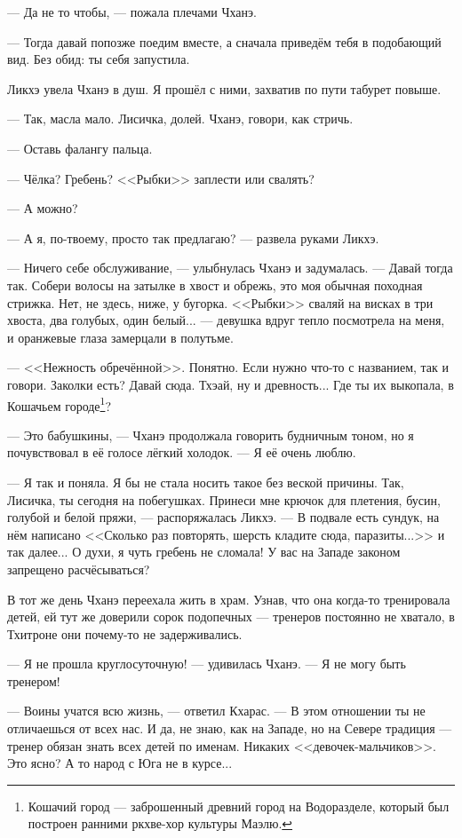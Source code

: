 --- Да не то чтобы, --- пожала плечами Чханэ.

--- Тогда давай попозже поедим вместе, а сначала приведём тебя в подобающий вид.
Без обид: ты себя запустила.

Ликхэ увела Чханэ в душ.
Я прошёл с ними, захватив по пути табурет повыше.

--- Так, масла мало.
Лисичка, долей.
Чханэ, говори, как стричь.

--- Оставь фалангу пальца.

--- Чёлка?
Гребень?
<<Рыбки>> заплести или свалять?

--- А можно?

--- А я, по-твоему, просто так предлагаю? --- развела руками Ликхэ.

--- Ничего себе обслуживание, --- улыбнулась Чханэ и задумалась.
--- Давай тогда так.
Собери волосы на затылке в хвост и обрежь, это моя обычная походная стрижка.
Нет, не здесь, ниже, у бугорка.
<<Рыбки>> сваляй на висках в три хвоста, два голубых, один белый... --- девушка вдруг тепло посмотрела на меня, и оранжевые глаза замерцали в полутьме.

--- <<Нежность обречённой>>.
Понятно.
Если нужно что-то с названием, так и говори.
Заколки есть?
Давай сюда.
Тхэай, ну и древность...
Где ты их выкопала, в Кошачьем городе\footnote{Кошачий город --- заброшенный древний город на Водоразделе, который был построен ранними ркхве-хор культуры Маэлю.}?

--- Это бабушкины, --- Чханэ продолжала говорить будничным тоном, но я почувствовал в её голосе лёгкий холодок.
--- Я её очень люблю.

--- Я так и поняла.
Я бы не стала носить такое без веской причины.
Так, Лисичка, ты сегодня на побегушках.
Принеси мне крючок для плетения, бусин, голубой и белой пряжи, --- распоряжалась Ликхэ.
--- В подвале есть сундук, на нём написано <<Сколько раз повторять, шерсть кладите сюда, паразиты...>> и так далее...
О духи, я чуть гребень не сломала!
У вас на Западе законом запрещено расчёсываться?

\asterism

В тот же день Чханэ переехала жить в храм.
Узнав, что она когда-то тренировала детей, ей тут же доверили сорок подопечных --- тренеров постоянно не хватало, в Тхитроне они почему-то не задерживались.

--- Я не прошла круглосуточную! --- удивилась Чханэ.
--- Я не могу быть тренером!

--- Воины учатся всю жизнь, --- ответил Кхарас.
--- В этом отношении ты не отличаешься от всех нас.
И да, не знаю, как на Западе, но на Севере традиция --- тренер обязан знать всех детей по именам.
Никаких <<девочек-мальчиков>>.
Это ясно?
А то народ с Юга не в курсе...

